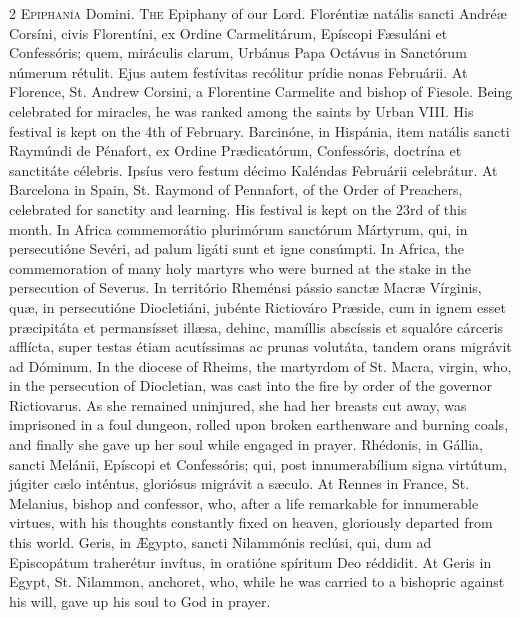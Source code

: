 \begin{paracol}{2}
\lettrine[lines=1]{E}{piphanía} Domini.
\switchcolumn
{}
\lettrine[lines=1]{T}{he} Epiphany of our Lord.
\switchcolumn*
{}
Floréntiæ natális sancti Andréæ Corsíni, civis 
 Florentíni, ex Ordine Carmelitárum, Epíscopi Fæsuláni et Confessóris; quem, 
 miráculis clarum, Urbánus Papa Octávus in Sanctórum númerum rétulit. Ejus autem festívitas recólitur prídie nonas Februárii.
\switchcolumn
{}
At Florence, St. Andrew Corsini, a Florentine Carmelite and bishop of 
 Fiesole. Being celebrated for miracles, he was ranked among the saints 
 by Urban VIII. His festival is kept on the 4th of February.
\switchcolumn*
{}
Barcinóne, in Hispánia, item natális sancti Raymúndi de Pénafort, ex Ordine 
 Prædicatórum, Confessóris, doctrína et 
 sanctitáte célebris. Ipsíus vero festum décimo Kaléndas Februárii 
 celebrátur.
\switchcolumn
{}
At Barcelona in Spain, St. Raymond of Pennafort, of the Order of Preachers, 
 celebrated for sanctity and learning. His festival is kept on the 23rd 
 of this month.
\switchcolumn*
{}
In Africa commemorátio plurimórum sanctórum Mártyrum, qui, in persecutióne 
 Sevéri, ad palum ligáti sunt et igne consúmpti.
\switchcolumn
{}
In Africa, the commemoration of many holy martyrs who were burned at the 
 stake in the persecution of Severus.
\switchcolumn*
{}
In território Rheménsi pássio sanctæ Macræ 
 Vírginis, quæ, in persecutióne Diocletiáni, jubénte Rictiováro Præside, cum 
 in ignem esset præcipitáta et permansísset illæsa, dehinc, mamíllis 
 abscíssis et squalóre cárceris afflícta, super testas étiam acutíssimas ac 
 prunas volutáta, tandem orans migrávit ad Dóminum.
\switchcolumn
{}
In the diocese of Rheims, the martyrdom of St. Macra, virgin, who, in the 
 persecution of Diocletian, was cast into the fire by order of the governor 
 Rictiovarus. As she remained uninjured, she had her breasts cut away, 
 was imprisoned in a foul dungeon, rolled upon broken earthenware and burning 
 coals, and finally she gave up her soul while engaged in prayer.
\switchcolumn*
{}
Rhédonis, in Gállia, sancti Melánii, Epíscopi 
 et Confessóris; qui, post innumerabílium signa virtútum, júgiter cælo 
 inténtus, gloriósus migrávit a sæculo.
\switchcolumn
{}
At Rennes in France, St. Melanius, bishop and confessor, who, after a life 
 remarkable for innumerable virtues, with his thoughts constantly fixed on 
 heaven, gloriously departed from this world.
\switchcolumn*
{}
Geris, in Ægypto, sancti Nilammónis reclúsi, 
 qui, dum ad Episcopátum traherétur invítus, in oratióne spíritum Deo 
 réddidit.
\switchcolumn
{}
At Geris in Egypt, St. Nilammon, anchoret, who, while he was carried to a 
 bishopric against his will, gave up his soul to God in prayer.
\switchcolumn*
{}
\end{paracol}


